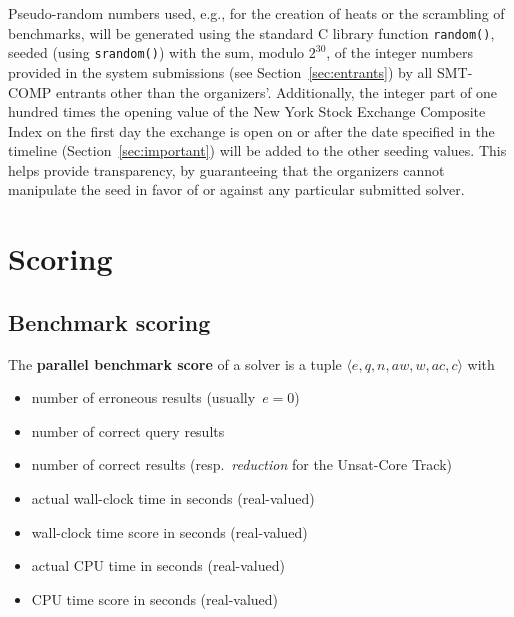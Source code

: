 \documentclass[12pt]{article}
\newcommand{\ucoretrack}{Unsat-Core Track\xspace}
\begin{document}
%
Pseudo-random numbers used, e.g., for the creation of heats or the
scrambling of benchmarks, will be generated using the standard C
library function \texttt{random()}, seeded (using \texttt{srandom()})
with the sum, modulo $2^{30}$, of the integer numbers provided in the
system submissions (see Section~\ref{sec:entrants}) by all SMT-COMP
entrants other than the organizers'.  Additionally, the integer part
of one hundred times the opening value of the New York Stock Exchange
Composite Index on
the first day the exchange is open on or after the date specified in
the timeline (Section~\ref{sec:important}) will be added to the other
seeding values. This helps provide transparency, by guaranteeing that
the organizers cannot manipulate the seed in favor of or against any
particular submitted solver.


\section{Scoring}
\label{sec:scoring}

\subsection{Benchmark scoring}
\label{sec:benchmark-scoring}

The \textbf{parallel benchmark score} of a solver is a tuple $\langle
e, q, n, \mathit{aw}, w, \mathit{ac},c\rangle$ with
\begin{itemize}[noitemsep]
  \vspace{-1ex}
  \item {}
    number of erroneous results (usually~$e = 0$)
  \item {}
    number of correct query results
  \item {}
    number of correct results (resp.~\emph{reduction} for the \ucoretrack)
  \item {}
    actual wall-clock time in seconds (real-valued)
  \item {}
    wall-clock time score in seconds (real-valued)
  \item {}
    actual CPU time in seconds (real-valued)
  \item {}
    CPU time score in seconds (real-valued)
\end{itemize}
\end{document}
